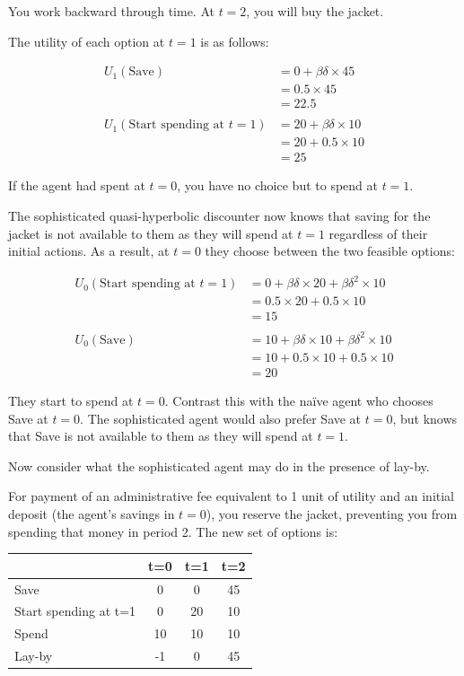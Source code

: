 \documentclass[
  letterpaper,
  DIV=11,
  numbers=noendperiod]{scrreprt}
\begin{document}
You work backward through time. At \(t=2\), you will buy the jacket.

The utility of each option at \(t=1\) is as follows:

\begin{align*}
U_1(\text{Save})&=0+\beta\delta\times 45 \\
&=0.5\times 45 \\
&=22.5 \\
\\
U_1(\text{Start spending at }t=1)&=20+\beta\delta \times 10 \\
&=20+0.5\times 10 \\
&=25
\end{align*}

If the agent had spent at \(t=0\), you have no choice but to spend at
\(t=1\).

The sophisticated quasi-hyperbolic discounter now knows that saving for
the jacket is not available to them as they will spend at \(t=1\)
regardless of their initial actions. As a result, at \(t=0\) they choose
between the two feasible options:

\begin{align*}
U_0(\text{Start spending at }t=1)&=0+\beta\delta \times 20+\beta\delta^2\times 10 \\
&=0.5\times 20+0.5\times 10 \\
&=15 \\
\\
U_0(\text{Save})&=10+\beta\delta \times 10+\beta\delta^2\times 10 \\
&=10+0.5\times 10+0.5\times 10 \\
&=20
\end{align*}

They start to spend at \(t=0\). Contrast this with the naïve agent who
chooses Save at \(t=0\). The sophisticated agent would also prefer Save
at \(t=0\), but knows that Save is not available to them as they will
spend at \(t=1\).

Now consider what the sophisticated agent may do in the presence of
lay-by.

For payment of an administrative fee equivalent to 1 unit of utility and
an initial deposit (the agent's savings in \(t=0\)), you reserve the
jacket, preventing you from spending that money in period 2. The new set
of options is:

\begin{longtable}[]{@{}lccc@{}}
\toprule()
& t=0 & t=1 & t=2 \\
\midrule()
\endhead
Save & 0 & 0 & 45 \\
Start spending at t=1 & 0 & 20 & 10 \\
Spend & 10 & 10 & 10 \\
Lay-by & -1 & 0 & 45 \\
\bottomrule()
\end{longtable}
\end{document}
